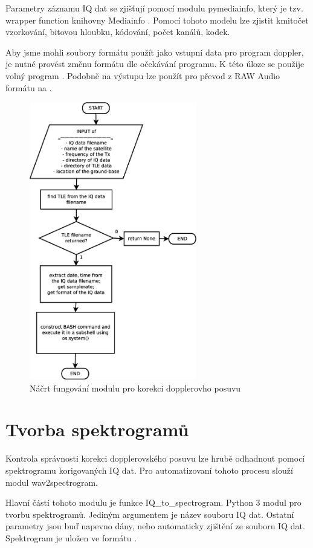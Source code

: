   Parametry záznamu IQ dat se zjišťují pomocí modulu pymediainfo, který je tzv. wrapper function knihovny Mediainfo \cite{github:pymediainfo}. Pomocí tohoto modelu lze zjistit kmitočet vzorkování, bitovou hloubku, kódování, počet kanálů, kodek.

  Aby jsme mohli soubory formátu  použít jako vstupní data pro program doppler, je nutné provést změnu formátu dle očekávání programu. K této úloze se použije volný program . Podobně na výstupu lze použít  pro převod z RAW Audio formátu na .

  \begin{figure}[ht]
    \centering
    \includegraphics[width=0.65\textwidth]{./obrazky/get_undopplered.eps}
    \caption{Náčrt fungování modulu pro korekci dopplerovho posuvu}
    \label{fig:undoppler}
  \end{figure}

\section{Tvorba spektrogramů}

Kontrola správnosti korekci dopplerovského posuvu lze hrubě odhadnout pomocí spektrogramu korigovaných IQ dat. Pro automatizovaní tohoto procesu slouží modul wav2spectrogram.

Hlavní částí tohoto modulu je funkce IQ\_to\_spectrogram.
Python 3 modul pro tvorbu spektrogramů. Jediným argumentem je název souboru IQ dat. Ostatní parametry jsou buď napevno dány, nebo automaticky zjištění ze souboru IQ dat. Spektrogram je uložen ve formátu .
